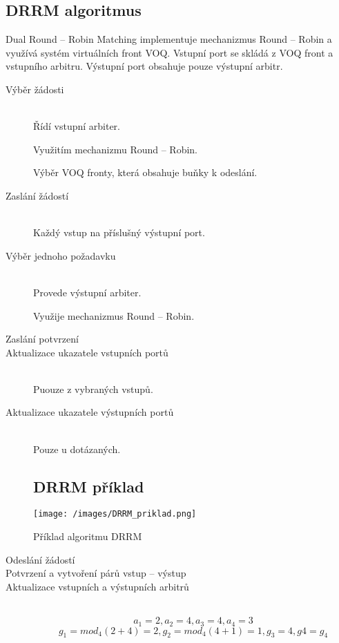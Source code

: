 \subsection{DRRM algoritmus}
Dual Round -- Robin Matching implementuje mechanizmus Round -- Robin a využívá systém virtuálních front VOQ. Vstupní port se skládá z VOQ front a vstupního arbitru. Výstupní port obsahuje pouze výstupní arbitr.
\begin{description}
  \item [Výběr žádosti] \hfill \\
  Řídí vstupní arbiter. \par
  Využitím mechanizmu Round -- Robin. \par
  Výběr VOQ fronty, která obsahuje buňky k odeslání. \par
  \item [Zaslání žádostí] \hfill \\
  Každý vstup na příslušný výstupní port. \par
  \item [Výběr jednoho požadavku] \hfill \\
  Provede výstupní arbiter. \par
  Využije mechanizmus Round -- Robin. \par
  \item[Zaslání potvrzení] \hfill
  \item [Aktualizace ukazatele vstupních portů] \hfill \\
  Puouze z vybraných vstupů. \par
  \item [Aktualizace ukazatele výstupních portů] \hfill \\
  Pouze u dotázaných. \par
  \subsection{DRRM příklad}
\end{description}
\begin{figure}[ht]
\centering
  \begin{center}
    \texttt{[image: /images/DRRM\_priklad.png]}
  \end{center}
  \caption[Příklad algoritmu DRRM]{Příklad algoritmu DRRM}
\end{figure}
\begin{description}
\item [Odeslání žádostí] \hfill
\item [Potvrzení a vytvoření párů vstup -- výstup] \hfill
\item [Aktualizace vstupních a výstupních arbitrů] \hfill \\
\begin{equation}
    a_1 = 2, a_2 = 4, a_3 = 4, a_4 = 3
\end{equation}
\begin{equation}
    g_1 = mod_4{(2+4)} = 2, g_2 = mod_4{(4+1) = 1}, g_3 = 4, g4 = g_4
\end{equation}
\end{description}
